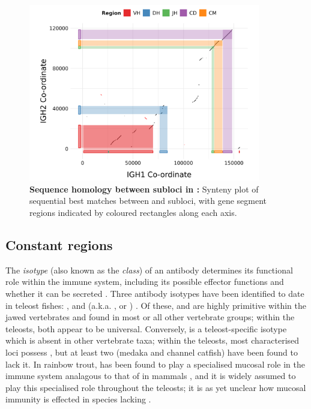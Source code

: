 \begin{figure}
	\centering
	\includegraphics[width=0.9\textwidth]{_Figures/png/nfu-locus-dots}
	\caption[Sequence homology between subloci in \Nfu \igh{}]{\textbf{Sequence homology between subloci in \Nfu \igh{}:} Synteny plot of sequential best matches between  and  subloci, with gene segment regions indicated by coloured rectangles along each axis.}
	\label{fig:nfu-locus-synteny}
\end{figure}

	
	\subsection{Constant regions}
	\label{sec:nfu-locus-constant}
	
	The \textit{isotype} (also known as the \textit{class}) of an antibody determines its functional role within the immune system, including its possible effector functions and whether it can be secreted \parencite{schroeder2010immunoglobulins}. Three antibody isotypes have been identified to date in teleost fishes: ,  and  (a.k.a. ,  or ) \parencite{fillatreau2013astonishing,bengten2015fishantibodies,magadan2015fishrepertoires}. Of these,  and  are highly primitive within the jawed vertebrates and found in most or all other vertebrate groups; within the teleosts, both appear to be universal. Conversely,  is a teleost-specific isotype which is absent in other vertebrate taxa; within the teleosts, most characterised \igh{} loci possess , but at least two (medaka and channel catfish) have been found to lack it. In rainbow trout,  has been found to play a specialised mucosal role in the immune system analagous to that of  in mammals \parencite{zhang2010igtgut,xu2013igtskin}, and it is widely assumed to play this specialised role throughout the teleosts; it is as yet unclear how mucosal immunity is effected in species lacking .
	
